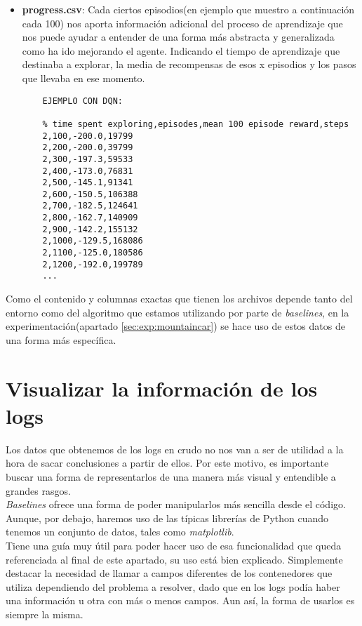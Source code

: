 \documentclass[11pt,fleqn]{book} %
\begin{document}
\begin{itemize}
	\item \textbf{progress.csv}: Cada ciertos episodios(en ejemplo que muestro a continuación cada 100) nos aporta información adicional del proceso de aprendizaje que nos puede ayudar a entender de una forma más abstracta y generalizada como ha ido mejorando el agente. Indicando el tiempo de aprendizaje que destinaba a explorar, la media de recompensas de esos x episodios y los pasos que llevaba en ese momento.\\
	
	
	\begin{verbatim}
	EJEMPLO CON DQN:
	
	% time spent exploring,episodes,mean 100 episode reward,steps
	2,100,-200.0,19799
	2,200,-200.0,39799
	2,300,-197.3,59533
	2,400,-173.0,76831
	2,500,-145.1,91341
	2,600,-150.5,106388
	2,700,-182.5,124641
	2,800,-162.7,140909
	2,900,-142.2,155132
	2,1000,-129.5,168086
	2,1100,-125.0,180586
	2,1200,-192.0,199789
	...
	\end{verbatim}
\end{itemize}

Como el contenido y columnas exactas que tienen los archivos depende tanto del entorno como del algoritmo que estamos utilizando por parte de \textit{baselines}, en la experimentación(apartado \ref{sec:exp:mountaincar}) se hace uso de estos datos de una forma más específica.

\section{Visualizar la información de los logs}\label{sec:visualizarlogs}

Los datos que obtenemos de los logs en crudo no nos van a ser de utilidad a la hora de sacar conclusiones a partir de ellos. Por este motivo, es importante buscar una forma de representarlos de una manera más visual y entendible a grandes rasgos. \\

\textit{Baselines} ofrece una forma de poder manipularlos más sencilla desde el código. Aunque, por debajo, haremos uso de las típicas librerías de Python cuando tenemos un conjunto de datos, tales como \textit{matplotlib}. \\

Tiene una guía muy útil para poder hacer uso de esa funcionalidad que queda referenciada al final de este apartado, su uso está bien explicado. Simplemente destacar la necesidad de llamar a campos diferentes de los contenedores que utiliza dependiendo del problema a resolver, dado que en los logs podía haber una información u otra con más o menos campos. Aun así, la forma de usarlos es siempre la misma.\cite{article:plot} \\
\end{document}
